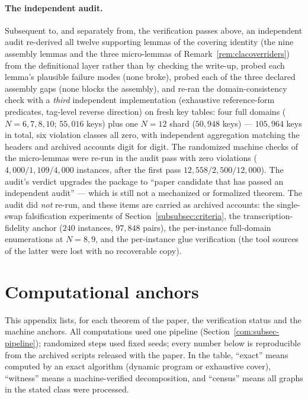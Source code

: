\paragraph{The independent audit.} Subsequent to, and separately from, the
verification passes above, an independent audit re-derived all twelve
supporting lemmas of the covering identity (the nine assembly lemmas and
the three micro-lemmas of Remark~\ref{rem:clacoverriders}) from the
definitional layer rather than by checking the write-up, probed each
lemma's plausible failure modes (none broke), probed each of the three
declared assembly gaps (none blocks the assembly), and re-ran the
domain-consistency check with a \emph{third} independent implementation
(exhaustive reference-form predicates, tag-level reverse direction) on
fresh key tables: four full domains ($N=6,7,8,10$; $55{,}016$ keys) plus
one $N=12$ shard ($50{,}948$ keys) --- $105{,}964$ keys in total, six
violation classes all zero, with independent aggregation matching the
headers and archived accounts digit for digit. The randomized machine
checks of the micro-lemmas were re-run in the audit pass with zero
violations ($4{,}000/1{,}109/4{,}000$ instances, after the first pass
$12{,}558/2{,}500/12{,}000$). The audit's verdict upgrades the package to
``paper candidate that has passed an independent audit'' --- which is
still not a mechanized or formalized theorem. The audit did \emph{not}
re-run, and these items are carried as archived accounts: the
single-swap falsification experiments of Section~\ref{subsubsec:criteria},
the transcription-fidelity anchor ($240$ instances, $97{,}848$ pairs), the
per-instance full-domain enumerations at $N=8,9$, and the per-instance
glue verification (the tool sources of the latter were lost with no
recoverable copy).

\appendix

\section{Computational anchors}\label{com:app-comp}

This appendix lists, for each theorem of the paper, the verification
status and the machine anchors. All computations used one pipeline
(Section~\ref{com:subsec-pipeline}); randomized steps used fixed seeds;
every number below is reproducible from the archived scripts released
with the paper. In the table, ``exact'' means computed by an exact
algorithm (dynamic program or exhaustive cover), ``witness'' means a
machine-verified decomposition, and ``census'' means all graphs in the
stated class were processed.

